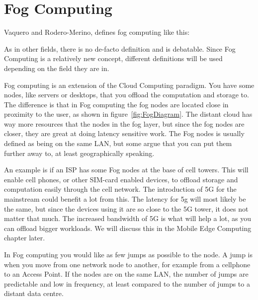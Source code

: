 




\section{Fog Computing}

Vaquero and Rodero-Merino\cite{vaquero_finding_2014}, defines fog computing like this: 

As in other fields, there is no de-facto definition and is debatable. Since Fog Computing is a relatively new concept, different definitions will be used depending on the field they are in.

Fog computing is an extension of the Cloud Computing paradigm. You have some nodes, like servers or desktops, that you offload the computation and storage to. The difference is that in Fog computing the fog nodes are located close in proximity to the user\cite{msftadmin_concept_2020}, as shown in figure~\ref{fig:FogDiagram}. The distant cloud has way more resources that the nodes in the fog layer, but since the fog nodes are closer, they are great at doing latency sensitive work. The Fog nodes is usually defined as being on the same LAN, but some argue that you can put them further away to, at least geographically speaking. 

An example is if an ISP has some Fog nodes at the base of cell towers. This will enable cell phones, or other SIM-card enabled devices, to offload storage and computation easily through the cell network. The introduction of 5G for the mainstream could benefit a lot from this. The latency for 5g will most likely be the same, but since the devices using it are so close to the 5G tower, it does not matter that much. The increased bandwidth of 5G is what will help a lot, as you can offload bigger workloads. We will discuss this in the Mobile Edge Computing chapter later. 

In Fog computing you would like as few jumps as possible to the node. A jump is when you move from one network node to another, for example from a cellphone to an Access Point. If the nodes are on the same LAN, the number of jumps are predictable and low in frequency, at least compared to the number of jumps to a distant data centre. 


